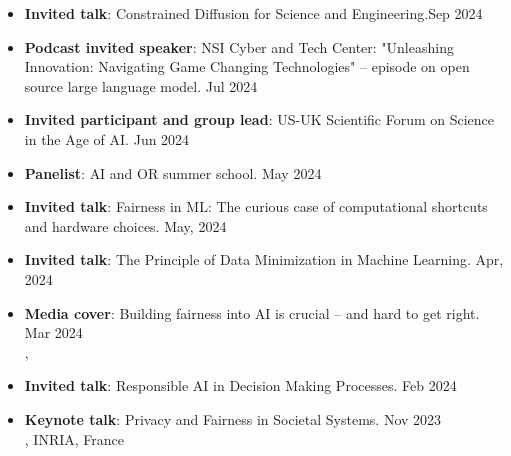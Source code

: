 \begin{itemize}
  \item {\bf Invited talk}: Constrained Diffusion for Science and Engineering.\hfill {Sep 2024}\\

  \item {\bf Podcast invited speaker}: 
  NSI Cyber and Tech Center: "Unleashing Innovation: Navigating Game Changing Technologies" -- episode on open source large language model.
  \hfill{Jul 2024}\\

  \item {\bf Invited participant and group lead}: 
  {US-UK Scientific Forum on Science in the Age of AI.} \hfill{Jun 2024}\\

  \item {\bf Panelist}: {AI and OR summer school.} \hfill{May 2024}\\

  \item {\bf Invited talk}: Fairness in ML: The curious case of computational shortcuts and hardware choices. \hfill{May, 2024}\\

  \item {\bf Invited talk}: The Principle of Data Minimization in Machine Learning. \hfill{Apr, 2024}\\
  {}

  \item {\bf Media cover}: 
  {Building fairness into AI is crucial – and hard to get right.} \hfill {Mar 2024} \\
  , 

  \item {\bf Invited talk}: Responsible AI in Decision Making Processes. \hfill{Feb 2024}\\
  {}
  
  \item {\bf Keynote talk}: {Privacy and Fairness in Societal Systems.} \hfill{Nov 2023}\\
  {, INRIA, France}


\end{itemize}
